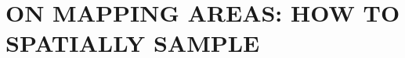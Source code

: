 \documentclass[psfig,preprint]{aastex}
\begin{document}
 
\section{ON MAPPING AREAS: HOW TO SPATIALLY SAMPLE} \label{sampling} 
\end{document}
